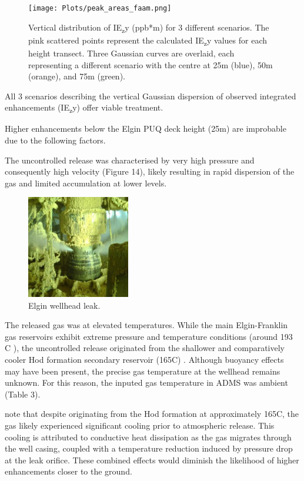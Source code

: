 \documentclass[12pt]{article}
\begin{document}
\begin{figure}[H]
\centering
\texttt{[image: Plots/peak\_areas\_faam.png]}
\caption{\label{fig:volume source}}Vertical distribution of IE\textsubscript{z}y
(ppb*m) for 3 different scenarios. The pink scattered points represent the calculated IE\textsubscript{z}y values for each height transect. Three Gaussian curves are overlaid, each representing a different scenario with the centre at 25m (blue), 50m (orange), and 75m (green).  
\end{figure}

All 3 scenarios describing the vertical Gaussian dispersion of observed integrated enhancements (IE\textsubscript{z}y) offer viable treatment. 

Higher enhancements below the Elgin PUQ  deck height (25m) are improbable due to the following factors.

The uncontrolled release was characterised by very high pressure and consequently high velocity (Figure 14),  likely resulting in rapid dispersion of the gas and limited accumulation at lower levels.
\begin{figure}[H]
\centering
\includegraphics[width=0.4\textwidth]{Plots/wellhead.jpg}
\caption{\label{fig:volume source}Elgin wellhead leak.}  
\end{figure}


The released gas was at elevated temperatures. While the main Elgin-Franklin gas reservoirs exhibit extreme pressure and temperature conditions (around 193 \textdegree C ), the uncontrolled release originated from the shallower and comparatively cooler Hod formation secondary reservoir (165\textdegree C) \parencite{Lee2018FlowRelease}. Although buoyancy effects may have been present, the precise gas temperature at the wellhead remains unknown. For this reason, the inputed gas temperature in ADMS was ambient (Table 3). 

\cite{Lee2018FlowRelease} note that despite originating from the Hod formation at approximately 165\textdegree C, the gas likely experienced significant cooling prior to atmospheric release. This cooling is attributed to conductive heat dissipation as the gas migrates through the well casing, coupled with a temperature reduction induced by pressure drop at the leak orifice.  These combined effects would diminish the likelihood of higher enhancements closer to the ground. 
\end{document}
